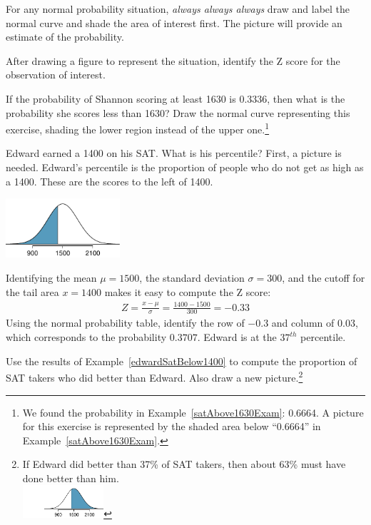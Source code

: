 \begin{tipBox}{
For any normal probability situation, \emph{always always always} draw and label the normal curve and shade the area of interest first. The picture will provide an estimate of the probability. \vspace{3mm}

After drawing a figure to represent the situation, identify the Z score for the observation of interest.\vspace{1mm}}
\end{tipBox}

\begin{exercise}
If the probability of Shannon scoring at least 1630 is 0.3336, then what is the probability she scores less than 1630? Draw the normal curve representing this exercise, shading the lower region instead of the upper one.\footnote{We found the probability in Example~\ref{satAbove1630Exam}: 0.6664. A picture for this exercise is represented by the shaded area below ``0.6664'' in Example~\ref{satAbove1630Exam}.}
\end{exercise}

\begin{example}{Edward earned a 1400 on his SAT. What is his percentile?} \label{edwardSatBelow1400}
First, a picture is needed. Edward's percentile is the proportion of people who do not get as high as a 1400. These are the scores to the left of 1400.
\begin{center}
\includegraphics[height=22mm]{03/figures/satBelow1400/satBelow1400}
\end{center}
Identifying the mean $\mu=1500$, the standard deviation $\sigma=300$, and the cutoff for the tail area $x=1400$ makes it easy to compute the Z score:
\begin{eqnarray*}
Z = \frac{x - \mu}{\sigma} = \frac{1400 - 1500}{300} = -0.33
\end{eqnarray*}
Using the normal probability table, identify the row of $-0.3$ and column of $0.03$, which corresponds to the probability $0.3707$. Edward is at the $37^{th}$ percentile.
\end{example}

\begin{exercise}
Use the results of Example~\ref{edwardSatBelow1400} to compute the proportion of SAT takers who did better than Edward. Also draw a new picture.\footnote{If Edward did better than 37\% of SAT takers, then about 63\% must have done better than him. \\
\includegraphics[height=12mm]{03/figures/satBelow1400/satAbove1400}}
\end{exercise}

